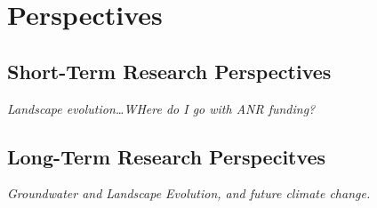 \chapter{Perspectives}

\section{Short-Term Research Perspectives}

\emph{Landscape evolution\dots WHere do I go with ANR funding?}

\section{Long-Term Research Perspecitves}

\emph{Groundwater and Landscape Evolution, and future climate change.}
